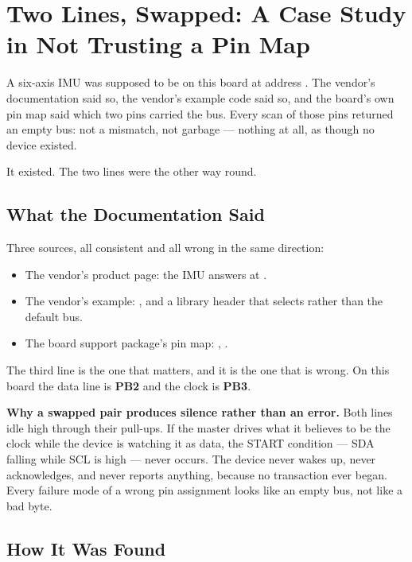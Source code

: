\section{Two Lines, Swapped: A Case Study in Not Trusting a Pin Map}
\label{sec:i2c-swapped-lines}

A six-axis IMU was supposed to be on this board at address . The vendor's
documentation said so, the vendor's example code said so, and the board's own pin map said
which two pins carried the bus. Every scan of those pins returned an empty bus: not a
mismatch, not garbage — nothing at all, as though no device existed.

It existed. The two lines were the other way round.

\subsection{What the Documentation Said}

Three sources, all consistent and all wrong in the same direction:

\begin{itemize}
    \item The vendor's product page: the IMU answers at .
    \item The vendor's example: , and a library
          header that selects  rather than the default bus.
    \item The board support package's pin map: ,
          .
\end{itemize}

The third line is the one that matters, and it is the one that is wrong. On this board the
data line is \textbf{PB2} and the clock is \textbf{PB3}.

\begin{warningbox}
    \textbf{Why a swapped pair produces silence rather than an error.} Both lines idle high
    through their pull-ups. If the master drives what it believes to be the clock while the
    device is watching it as data, the START condition — SDA falling while SCL is high —
    never occurs. The device never wakes up, never acknowledges, and never reports anything,
    because no transaction ever began. Every failure mode of a wrong pin assignment looks
    like an empty bus, not like a bad byte.
\end{warningbox}

\subsection{How It Was Found}

